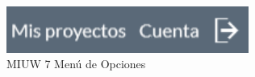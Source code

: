 \begin{figure}[H]
	\centering
	\includegraphics[width=300px]{capitulo4/imagenes/web/IUW_7.png}
	\caption{MIUW 7 Menú de Opciones}
	\label{fig:MIUW-7}
\end{figure}